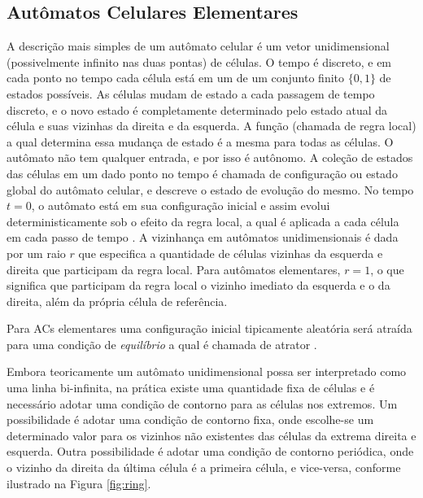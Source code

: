 \documentclass[12pt,a4paper]{article}
\begin{document}
\subsection{Autômatos Celulares Elementares}

A descrição mais simples de um autômato celular é um vetor unidimensional (possivelmente
infinito nas duas pontas) de células. O tempo é discreto, e em cada ponto no tempo cada
célula está em um de um conjunto finito $\{0,1\}$ de estados possíveis. As células mudam
de estado a cada passagem de tempo discreto, e o novo estado é completamente determinado pelo
estado atual da célula e suas vizinhas da direita e da esquerda. A função (chamada
de regra local) a qual determina essa mudança de estado é a mesma para todas as células.
O autômato não tem qualquer entrada, e por isso é autônomo. A coleção de estados das células
em um dado ponto no tempo é chamada de configuração ou estado global do autômato celular, e
descreve o estado de evolução do mesmo. No tempo $t=0$, o autômato está em sua configuração
inicial e assim evolui deterministicamente sob o efeito da regra local, a qual é aplicada
a cada célula em cada passo de tempo . A vizinhança em autômatos unidimensionais
é dada por um raio $r$ que especifica a quantidade de células vizinhas da esquerda e direita
que participam da regra local. Para autômatos elementares, $r=1$, o que significa que participam
da regra local o vizinho imediato da esquerda e o da direita, além da própria célula de referência.

Para ACs elementares uma configuração inicial tipicamente aleatória será atraída
para uma condição de \textit{equilíbrio} a qual é chamada de atrator .

Embora teoricamente um autômato unidimensional possa ser interpretado como uma linha bi-infinita,
na prática existe uma quantidade fixa de células e é necessário adotar uma condição de contorno
para as células nos extremos. Um possibilidade é adotar uma condição de contorno fixa, onde
escolhe-se um determinado valor para os vizinhos não existentes das células da extrema direita
e esquerda. Outra possibilidade é adotar uma condição de contorno periódica, onde o vizinho
da direita da última célula é a primeira célula, e vice-versa, conforme ilustrado na Figura
\ref{fig:ring}.
\end{document}
